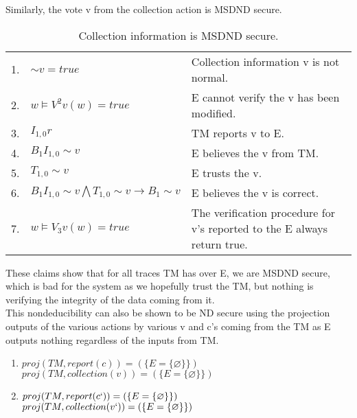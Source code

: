 \documentclass[journal,onecolumn]{IEEEtran}
\begin{document}
\begin{enumerate}
\begin{enumerate}
      Similarly, the vote v from the collection action is MSDND secure. 

      \begin{table}[H]
        \caption{Collection information is MSDND secure.}
        \centering
        \begin{tabular}{lll}
        1.  & ${\sim} v = true$                                                 & Collection information v is not normal.                                                       \\
        2.  & $w \vDash V^2 v(w) = true$                                      & E cannot verify the v has been modified.                                 \\
        3.  & $I_{1,0}r$                                                        & TM reports v to E.                                                \\
        4.  & $B_1I_{1,0} {\sim} v$                                               & E believes the v from TM.                                     \\
        5.  & $T_{1,0} {\sim} v$                                                  & E trusts the v.                                                          \\
        6.  & $B_1I_{1,0} {\sim} v \bigwedge T_{1,0} {\sim} v \rightarrow B_1 {\sim} v$ & E believes the v is correct.                                             \\
        7. & $w \vDash V_3 v(w) = true$                                       & The verification procedure for v's reported to the E always return true.
        \end{tabular}
      \end{table}

      These claims show that for all traces TM has over E, we are MSDND secure, which is bad for the system as we hopefully trust the TM, but nothing is verifying the integrity of the data coming from it. \\

      This nondeducibility can also be shown to be ND secure using the projection outputs of the various actions by various v and c's coming from the TM as E outputs nothing regardless of the inputs from TM. \\

      \begin{enumerate}
        \item $proj(TM, report(c)) = (\{E = \{\varnothing\}\})$ \\
        $proj(TM, collection(v)) = (\{E = \{\varnothing\}\})$
        \item $proj(TM, report(c`)) = (\{E = \{\varnothing\}\})$ \\
        $proj(TM, collection(v`)) = (\{E = \{\varnothing\}\})$ \\
      \end{enumerate}


\end{enumerate}
\end{enumerate}
\end{document}
